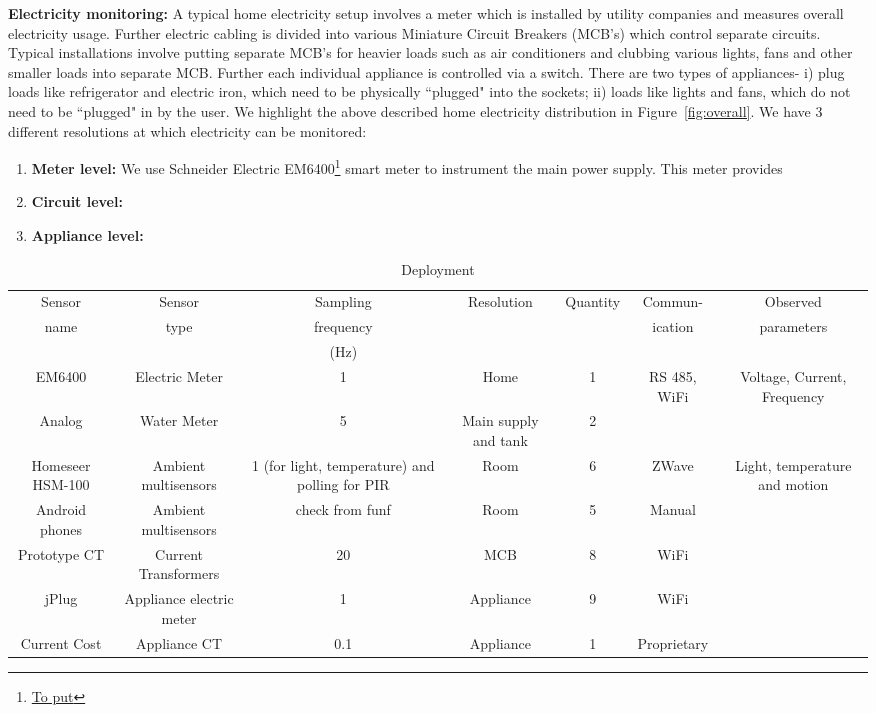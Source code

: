 \documentclass[10pt]{sensys-proc}
\newcommand{\figref}[1]{Figure~\ref{#1}}
\begin{document}
\noindent\textbf{Electricity monitoring:} A typical home electricity setup involves a meter which is installed by utility companies and measures overall electricity usage. Further electric cabling is divided into various Miniature Circuit Breakers (MCB's) which control separate circuits. Typical installations involve putting separate MCB's for heavier loads such as air conditioners and clubbing various lights, fans and other smaller loads into separate MCB. Further each individual appliance is controlled via a switch. There are two types of appliances- i) plug loads like refrigerator and electric iron, which need to be physically ``plugged" into the sockets; ii) loads like lights and fans, which do not need to be ``plugged" in by the user. We highlight the above described home electricity distribution in \figref{fig:overall}. We have 3 different resolutions at which electricity can be monitored:
\begin{enumerate}
\item \textbf{Meter level:} We use Schneider Electric EM6400\footnote{\url{To put}} smart meter to instrument the main power supply. This meter provides

\item \textbf{Circuit level:} 

\item \textbf{Appliance level:}
\end{enumerate}




\begin{table}
\caption{Deployment}

\label{tab:deployment}
\tabcolsep=0.02cm
\begin{tabular}{|c|c|c|c|c|c|c|}
\hline
Sensor&Sensor&Sampling&Resolution&Quantity&Commun-&Observed\\
name&type&frequency&&&ication&parameters\\
&&(Hz)&&&&\\
\hline

EM6400&Electric Meter&1&Home&1&RS 485, WiFi&Voltage, Current, Frequency\\
Analog&Water Meter&5&Main supply and tank&2&\\
Homeseer HSM-100&Ambient multisensors&1 (for light, temperature) and polling for PIR&Room &6&ZWave&Light, temperature and motion\\
Android phones&Ambient multisensors& check from funf&Room&5&Manual\\
Prototype CT&Current Transformers&20&MCB&8&WiFi\\
jPlug&Appliance electric meter & 1 &Appliance&9&WiFi\\
Current Cost&Appliance CT&0.1&Appliance&1&Proprietary\\
\hline

\end{tabular}


\end{table}
\end{document}
